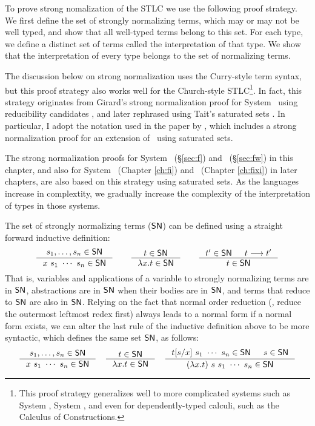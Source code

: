 To prove strong nomalization of the STLC we use the following proof strategy.
We first define the set of strongly normalizing terms, which may or may not be
well typed, and show that all well-typed terms belong to this set.
For each type, we define a distinct set of terms called the interpretation
of that type. We show that the interpretation of every type
belongs to the set of normalizing terms.

The discussion below on strong normalization uses the
Curry-style term syntax, but this proof strategy also works well
for the Church-style STLC\footnote{This proof strategy generalizes well
	to more complicated systems such as System \F, System \Fw, and
	even for dependently-typed calculi, such as
	the Calculus of Constructions\cite{Geuvers94}.}.
In fact, this strategy originates from Girard's strong normalization proof
for System \F\ using reducibility candidates \cite{Gir71}, and later rephrased
using Tait's saturated sets \cite{Tait75}. In particular, I adopt
the notation used in the paper by \citet{AbeMat04}, which includes
a strong normalization proof for an extension of \Fw\ using saturated sets.

The strong normalization proofs for System \F\ (\S\ref{sec:f}) and
\Fw\ (\S\ref{sec:fw}) in this chapter, and also for System \Fi\
(Chapter \ref{ch:fi}) and \Fixi\ (Chapter \ref{ch:fixi}) in later chapters,
are also based on this strategy using saturated sets. As the languages
increase in complextity, we gradually
increase the complexity of the interpretation of types in those systems.

The set of strongly normalizing terms ($\mathsf{SN}$) can be defined
using a straight forward inductive definition:
\[
\inference{s_1,\ldots,s_n\in\SN}{x~s_1~\cdots~s_n \in \SN}
\qquad
\inference{t \in \SN}{\l x.t \in \SN}
\qquad
\inference{t' \in \SN & t --> t'}{t \in \SN}
\]
That is, variables and applications of a variable to strongly normalizing terms
are in $\mathsf{SN}$, abstractions are in $\mathsf{SN}$ when their bodies are in $\mathsf{SN}$,
and terms that reduce to $\mathsf{SN}$ are also in $\mathsf{SN}$. Relying on the fact that
normal order reduction (\ie, reduce the outermost leftmost redex first) always
leads to a normal form if a normal form exists, we can alter the last rule of
the inductive definition above to be more syntactic, which defines the same set
$\mathsf{SN}$, as follows:
\[
\inference{s_1,\ldots,s_n\in\SN}{x~s_1~\cdots~s_n \in \SN}
\quad
\inference{t \in \SN}{\l x.t \in \SN}
\quad
\inference{t[s/x]~s_1~\cdots~s_n\in \SN & s\in\SN}
	{(\lambda x.t)~s~s_1~\cdots~s_n \in \SN}
\]

